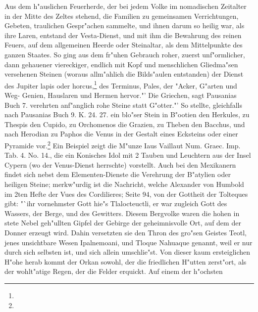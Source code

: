 \documentclass[a4paper, 11pt, oneside, polutonikogreek, german]{article}
\begin{document}
Aus dem h"auslichen Feuerherde, der bei jedem Volke im nomadischen Zeitalter in der Mitte des Zeltes stehend, die Familien zu gemeinsamen Verrichtungen, Gebeten, traulichen Gespr"achen sammelte, und ihnen darum so heilig war, als ihre Laren, entstand der Vesta-Dienst, und mit ihm die Bewahrung des reinen Feuers, auf dem allgemeinen Heerde oder Steinaltar, als dem Mittelpunkte des ganzen Staates. So ging aus dem fr"uhen Gebrauch roher, zuerst unf"ormlicher, dann gehauener viereckiger, endlich mit Kopf und menschlichen Gliedma"sen versehenen Steinen (woraus allm"ahlich die Bilds"aulen entstanden) der Dienst des Jupiter lapis oder horcus,\footnote{} des Terminus, Pales, der "Acker, G"arten und Weg- Genien, Hauslaren und Hermen hervor."' Die Griechen, sagt Pausanias Buch 7. verehrten anf"anglich rohe Steine statt G"otter."' So stellte, gleichfalls nach Pausanias Buch 9. K. 24. 27. ein blo"ser Stein in B"ootien den Herkules, zu Thespis den Cupido, zu Orchomenos die Grazien, zu Theben den Bacchus, und nach Herodian zu Paphos die Venus in der Gestalt eines Ecksteins oder einer Pyramide vor.\footnote{} Ein Beispiel zeigt die M"unze Iaus Vaillaut Num. Graec. Imp. Tab. 4. No. 14., die ein Konisches Idol mit 2 Tauben und Leuchtern aus der Insel Cypern (wo der Venus-Dienst herrschte) vorstellt. Auch bei den Mexikanern findet sich nebst dem Elementen-Dienste die Verehrung der B"atylien oder heiligen Steine; merkw"urdig ist die Nachricht, welche Alexander von Humbold im 2ten Hefte der Vues des Cordilieres; Seite 94, von der Gottheit der Tolteques gibt: "`ihr vornehmster Gott hie"s Tlalocteuctli, er war zugleich Gott des Wassers, der Berge, und des Gewitters. Diesem Bergvolke waren die hohen in stete Nebel geh"ullten Gipfel der Gebirge der geheimnisvolle Ort, auf dem der Donner erzeugt wird. Dahin versetzten sie den Thron des gro"sen Geistes Teotl, jenes unsichtbare Wesen Ipalnemoani, und Tloque Nahuaque genannt, weil er nur durch sich selbsten ist, und sich allein umschlie"st. Von dieser kaum ersteiglichen H"ohe herab kommt der Orkan sowohl, der die friedlichen H"utten zerst"ort, als der wohlt"atige Regen, der die Felder erquickt. Auf einem der h"ochsten 
\end{document}
